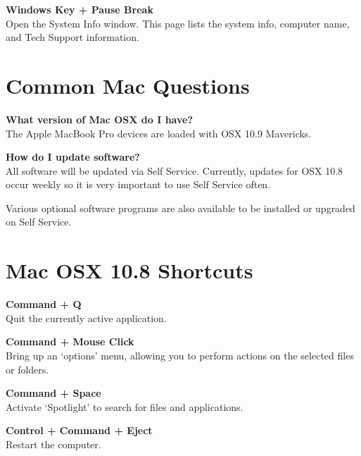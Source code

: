 \documentclass[10pt,foldmark,notumble]{leaflet}
\begin{document}
\textbf{Windows Key + Pause Break}\\
Open the System Info window. This page lists the system info, computer name, and Tech Support information.

\section{Common Mac Questions\color{red}\hrulefill\color{black}}
\textbf{What version of Mac OSX do I have?}\\
The Apple MacBook Pro devices are loaded with OSX 10.9 Mavericks.

\textbf{How do I update software?}\\
All software will be updated via Self Service. Currently, updates for OSX 10.8 occur weekly so it is very important to use Self Service often.

Various optional software programs are also available to be installed or upgraded on Self Service.



\section{Mac OSX 10.8 Shortcuts\color{red}\hrulefill\color{black}}
\textbf{Command + Q}\\
Quit the currently active application. %

\textbf{Command + Mouse Click}\\
Bring up an `options' menu, allowing you to perform actions on the selected files or folders.

\textbf{Command + Space}\\
Activate `Spotlight' to search for files and applications.

\textbf{Control + Command + Eject}\\
Restart the computer.
\end{document}
